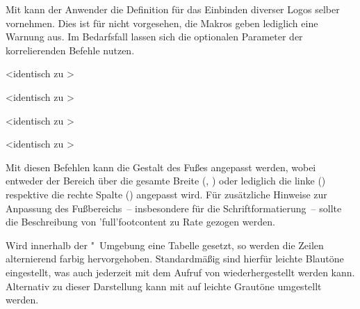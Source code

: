 \begin{DeclareEntity}{}
\begin{Declaration}
\begin{Declaration}
\begin{Declaration}
Mit  kann der Anwender die Definition für das Einbinden 
diverser Logos selber vornehmen. Dies ist für \TUDScript nicht vorgesehen, 
die Makros geben lediglich eine Warnung aus. Im Bedarfsfall lassen sich die 
optionalen Parameter der korrelierenden Befehle nutzen. 
\end{Declaration}
\end{Declaration}
\end{Declaration}

\begin{Declaration}
  {}
  <identisch zu >
\begin{Declaration}
  {}
  <identisch zu >
\begin{Declaration}
  {}
  <identisch zu >
\begin{Declaration}
  {}
  <identisch zu >
\printdeclarationlist

Mit diesen Befehlen kann die Gestalt des Fußes angepasst werden, wobei entweder 
der Bereich über die gesamte Breite (, ) 
oder lediglich die linke () respektive die rechte Spalte 
() angepasst wird. Für zusätzliche Hinweise zur Anpassung 
des Fußbereichs~-- insbesondere für die Schriftformatierung~-- sollte die 
Beschreibung von \Macro*'full'{footcontent} zu Rate gezogen werden.
\end{Declaration}
\end{Declaration}
\end{Declaration}
\end{Declaration}

\begin{Declaration}
  {}
\begin{Declaration}
  {}
\begin{Declaration}
  {}
\printdeclarationlist

Wird innerhalb der "~Umgebung eine Tabelle gesetzt, 
so werden die Zeilen alternierend farbig hervorgehoben. Standardmäßig sind 
hierfür leichte Blautöne eingestellt, was auch jederzeit mit dem Aufruf von 
 wiederhergestellt werden kann. Alternativ zu dieser 
Darstellung kann mit  auf leichte Grautöne umgestellt werden.
\end{Declaration}
\end{Declaration}
\end{Declaration}


\end{DeclareEntity}
